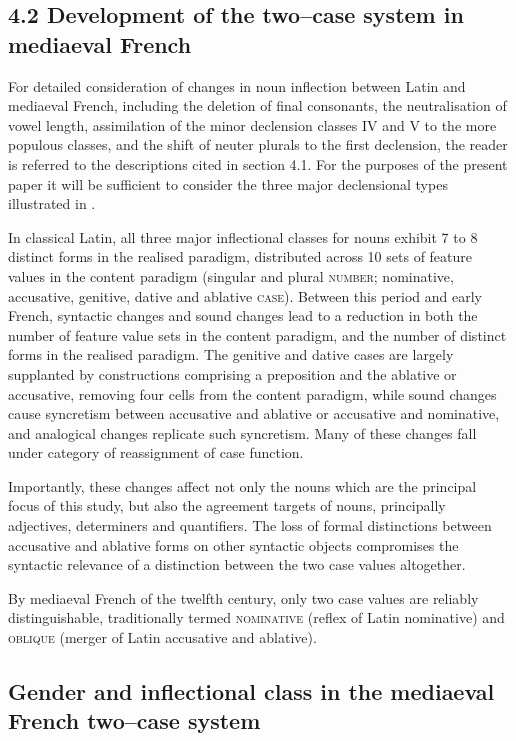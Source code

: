 \documentclass[output=paper]{langscibook}
\begin{document}
\subsection{4.2  Development of the two–case system in mediaeval French}

For detailed consideration of changes in noun inflection between Latin and mediaeval French, including the deletion of final consonants, the neutralisation of vowel length, assimilation of the minor declension classes IV and V to the more populous classes, and the shift of neuter plurals to the first declension, the reader is referred to the descriptions cited in section 4.1. For the purposes of the present paper it will be sufficient to consider the three major declensional types illustrated in . 

In classical Latin, all three major inflectional classes for nouns exhibit 7 to 8 distinct forms in the realised paradigm, distributed across 10 sets of feature values in the content paradigm (singular and plural \textsc{number}; nominative, accusative, genitive, dative and ablative \textsc{case}). Between this period and early French, syntactic changes and sound changes lead to a reduction in both the number of feature value sets in the content paradigm, and the number of distinct forms in the realised paradigm. The genitive and dative cases are largely supplanted by constructions comprising a preposition and the ablative or accusative, removing four cells from the content paradigm, while sound changes cause syncretism between accusative and ablative or accusative and nominative, and analogical changes replicate such syncretism. Many of these changes fall under  category of reassignment of case function. 

Importantly, these changes affect not only the nouns which are the principal focus of this study, but also the agreement targets of nouns, principally adjectives, determiners and quantifiers. The loss of formal distinctions between accusative and ablative forms on other syntactic objects compromises the syntactic relevance of a distinction between the two case values altogether. 

By mediaeval French of the twelfth century, only two case values are reliably distinguishable, traditionally termed \textsc{nominative} (reflex of Latin nominative) and \textsc{oblique} (merger of Latin accusative and ablative).

\subsection{Gender and inflectional class in the mediaeval French two–case system}
\end{document}
